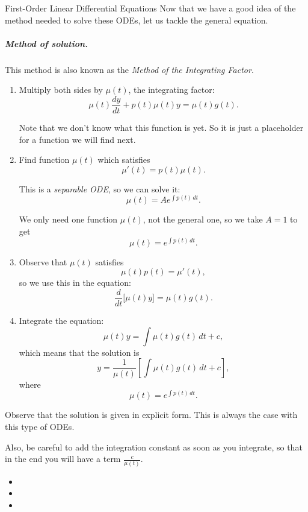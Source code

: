 \begin{submodule}{First-Order Linear Differential Equations}
Now that we have a good idea of the method needed to solve these ODEs, let us tackle the general equation.


\subparagraph{\emph{Method of solution. }} This method is also known as the \emph{Method of the Integrating Factor}. 
\begin{enumerate}[label={\bf \arabic*. } ]
\item Multiply both sides by $\mu(t)$, the integrating factor:
$$
\mu(t) \frac{dy}{dt} + p(t)\mu(t) y = \mu(t) g(t).
$$

Note that we don't know what this function is yet. So it is just a placeholder for a function we will find next.

\item Find function $\mu(t)$ which satisfies
$$
\mu'(t) = p(t) \mu(t).
$$

This is a \emph{separable ODE}, so we can solve it:
$$
\mu(t) = A e^{\int p(t) \, dt}.
$$

We only need one function $\mu(t)$, not the general one, so we take $A=1$ to get
$$
\mu(t) = e^{\int p(t) \, dt}.
$$

\item Observe that $\mu(t)$ satisfies
$$
\mu(t) p(t) = \mu'(t),
$$
so we use this in the equation:
$$
\frac{d}{dt} \big[ \mu(t) y \big] = \mu(t) g(t).
$$

\item Integrate the equation:
$$
\mu(t) y = \int \mu(t) g(t) \, dt + c,
$$
which means that the solution is
$$
y = \frac{1}{\mu(t)} \left[ \int \mu(t) g(t) \, dt + c \right],
$$
where 
$$
\mu(t) = e^{\int p(t) \, dt}.
$$

\end{enumerate}

\begin{important}
	Observe that the solution is given in explicit form. This is always the case with this type of ODEs.
	
	Also, be careful to add the integration constant as soon as you integrate, so that in the end you will have a term $\frac{c}{\mu(t)}$.
\end{important}


\begin{video}
\begin{itemize}
	\item {}
	\item {}
	\item {}
\end{itemize}	
\end{video}

\end{submodule}


